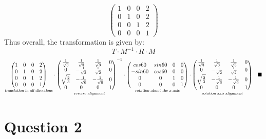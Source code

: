 \documentclass{article}
\newcommand{\proofend}{\quad\blacksquare}
\newcommand{\question}[1]{\section*{Question #1}\vspace{.5cm}}
\begin{document}
\begin{enumerate}
$$\begin{pmatrix}
            1&0&0&2\\
            0&1&0&2\\
            0&0&1&2\\
            0&0&0&1
        \end{pmatrix}
    $$
    Thus overall, the transformation is given by:
    $$T \cdot M^{-1} \cdot R \cdot M$$
    $$
    \underset{\textsl{translation in all directions}}{\begin{pmatrix}
        1&0&0&2\\
        0&1&0&2\\
        0&0&1&2\\
        0&0&0&1
    \end{pmatrix}}
    \cdot
    \underset{\textsl{reverse alignment}}{\begin{pmatrix}
        \frac{1}{\sqrt{3}}&\frac{1}{\sqrt{3}}&\frac{1}{\sqrt{3}}&0\\
        0&-\frac{1}{\sqrt{2}}&\frac{1}{\sqrt{2}}&0\\
        \sqrt{\frac{2}{3}}&-\frac{1}{\sqrt{6}}&-\frac{1}{\sqrt{6}}&0\\
        0&0&0&1
    \end{pmatrix}^{-1}}
    \cdot
    \underset{\textsl{rotation about the x-axis}}{\begin{pmatrix}
            cos60&sin60&0&0\\
            -sin60&cos60&0&0\\
            0&0&1&0\\
            0&0&0&1
        \end{pmatrix}}
        \cdot
        \underset{\textsl{rotation axis alignment}}{\begin{pmatrix}
            \frac{1}{\sqrt{3}}&\frac{1}{\sqrt{3}}&\frac{1}{\sqrt{3}}&0\\
            0&-\frac{1}{\sqrt{2}}&\frac{1}{\sqrt{2}}&0\\
            \sqrt{\frac{2}{3}}&-\frac{1}{\sqrt{6}}&-\frac{1}{\sqrt{6}}&0\\
            0&0&0&1
        \end{pmatrix}}\proofend
    $$
    \end{enumerate}
    \newpage
    \question{2}
\end{document}
